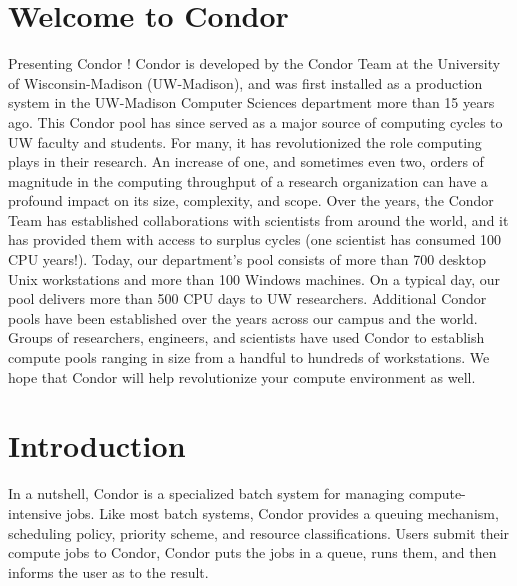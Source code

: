 \section{Welcome to Condor}  
%
% 
%

\label{sec:usermanual}
Presenting Condor \VersionNotice! Condor is developed by
the Condor Team at the University of Wisconsin-Madison (UW-Madison), and
was first installed as a production system in the UW-Madison Computer
Sciences department more than 15 years ago. This Condor pool has since
served as a major source of computing cycles to UW faculty and students.
For many, it has revolutionized the role computing plays in their
research. An increase of one, and sometimes even two, orders of
magnitude in the computing throughput of a research organization can
have a profound impact on its size, complexity, and scope. Over the
years, the Condor Team has established collaborations with scientists
from around the world, and it has provided them with access to surplus
cycles (one scientist has consumed 100 CPU years!). Today, our
department's pool consists of more than 700 desktop Unix workstations
and more than 100 Windows machines.
On a typical day, our pool delivers more than 500 CPU days to UW
researchers. Additional Condor pools have been established over the
years across our campus and the world. Groups of researchers, engineers,
and scientists have used Condor to establish compute pools ranging in
size from a handful to hundreds of workstations. We hope that Condor
will help revolutionize your compute environment as well.


\section{Introduction}


In a nutshell, Condor is a specialized batch system 
for managing compute-intensive jobs.
Like most batch systems, Condor provides a
queuing mechanism, scheduling policy, priority scheme, and resource
classifications.  Users submit their compute jobs to Condor, Condor puts
the jobs in a queue, runs them, and then informs the user as to the
result.


